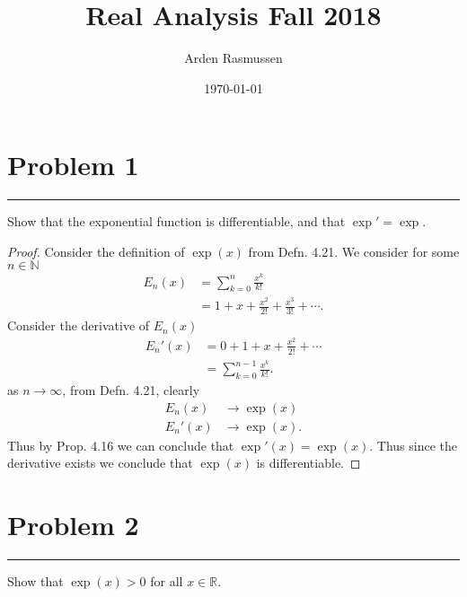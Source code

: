 \documentclass[12pt]{amsart}
\title{Real Analysis Fall 2018}
\author{Arden Rasmussen}
\date{\today}
\newcommand{\usec}[1]{%
\section*{#1}%
\noindent\rule{\textwidth}{2pt}%
\vspace{10pt}%
}
\newcommand{\prop}[1]{Prop. #1}
\newcommand{\defn}[1]{Defn. #1}
\newcommand{\N}{\mathbb{N}}
\newcommand{\R}{\mathbb{R}}
\begin{document}
\maketitle

\usec{Problem 1}%
\label{sec:problem_1}

Show that the exponential function is differentiable, and that $\exp'=\exp$.

\begin{proof}
  Consider the definition of $\exp(x)$ from \defn{4.21}. We consider for some
  $n\in\N$
  \begin{align*}
    E_n(x)&=\sum_{k=0}^n\frac{x^k}{k!}\\
          &=1+x+\frac{x^2}{2!}+\frac{x^3}{3!}+\cdots.
  \end{align*}
  Consider the derivative of $E_n(x)$
  \begin{align*}
    E_n'(x)&=0+1+x+\frac{x^2}{2!}+\cdots\\
           &=\sum_{k=0}^{n-1}\frac{x^k}{k!}.
  \end{align*}
  as $n\to\infty$, from \defn{4.21}, clearly
  \begin{align*}
    E_n(x)&\to\exp(x)\\
    E_n'(x)&\to\exp(x).
  \end{align*}
  Thus by \prop{4.16} we can conclude that $\exp'(x)=\exp(x)$. Thus since the
  derivative exists we conclude that $\exp(x)$ is differentiable.
\end{proof}

\usec{Problem 2}%
\label{sec:problem_2}

Show that $\exp(x)>0$ for all $x\in \R$.
\end{document}
